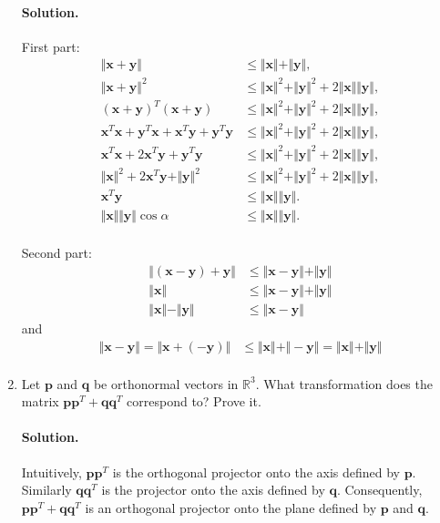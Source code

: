 \documentclass{article}
\newcommand{\bbR}{\mathbb{R}}
\newcommand{\bx}{\mathbf{x}}
\newcommand{\bq}{\mathbf{q}}
\newcommand{\by}{\mathbf{y}}
\newcommand{\bp}{\mathbf{p}}
\begin{document}
\begin{enumerate}
\paragraph{Solution.}
First part:
\begin{align*}
\Vert \bx + \by \Vert &\leq \Vert \bx \Vert + \Vert \by \Vert,\\
\Vert\bx + \by\Vert^2 &\leq \Vert\bx\Vert^2 + \Vert\by\Vert^2 + 2\Vert\bx\Vert\Vert\by\Vert,\\
(\bx + \by)^T(\bx+\by) &\leq \Vert\bx\Vert^2 + \Vert\by\Vert^2 + 2\Vert\bx\Vert\Vert\by\Vert,\\
\bx^T\bx + \by^T\bx + \bx^T\by + \by^T\by &\leq \Vert\bx\Vert^2 + \Vert\by\Vert^2 + 2\Vert\bx\Vert\Vert\by\Vert,\\
\bx^T\bx + 2\bx^T\by + \by^T\by &\leq \Vert\bx\Vert^2 + \Vert\by\Vert^2 + 2\Vert\bx\Vert\Vert\by\Vert,\\
\Vert\bx\Vert^2 + 2\bx^T\by + \Vert\by\Vert^2 &\leq \Vert\bx\Vert^2 + \Vert\by\Vert^2 + 2\Vert\bx\Vert\Vert\by\Vert,\\
\bx^T\by &\leq \Vert\bx\Vert\Vert\by\Vert.\\
\Vert\bx\Vert\Vert\by\Vert\cos\alpha &\leq \Vert\bx\Vert\Vert\by\Vert.\\
\end{align*}

Second part:
\begin{align*}
\Vert(\bx - \by) + \by\Vert  &\leq \Vert\bx - \by\Vert + \Vert \by \Vert \\
\Vert\bx\Vert  &\leq \Vert\bx - \by\Vert + \Vert \by \Vert \\
\Vert\bx\Vert - \Vert \by \Vert &\leq \Vert\bx - \by\Vert 
\end{align*}
and
\begin{align*}
\Vert\bx - \by\Vert = \Vert \bx + (-\by)\Vert  &\leq \Vert\bx\Vert + \Vert -\by \Vert = \Vert\bx\Vert + \Vert \by \Vert \\
\end{align*}

\item Let $\bp$ and $\bq$ be orthonormal vectors in $\bbR^3$. What transformation does the matrix $\bp\bp^T + \bq\bq^T$ correspond to? Prove it.

\paragraph{Solution.}
Intuitively, $\bp\bp^T$ is the orthogonal projector onto the axis defined by $\bp$. Similarly $\bq\bq^T$ is the projector onto the axis defined by $\bq$. Consequently, $\bp\bp^T+\bq\bq^T$ is an orthogonal projector onto the plane defined by $\bp$ and $\bq$.


\end{enumerate}
\end{document}
